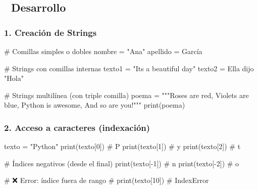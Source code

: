 \documentclass[
  doc,
  floatsintext,
  longtable,
  a4paper,
  nolmodern,
  notxfonts,
  notimes,
  12pt,
  colorlinks=true,linkcolor=blue,citecolor=blue,urlcolor=blue]{apa7}
\newenvironment{Shaded}{\begin{snugshade}}{\end{snugshade}}
\newcommand{\BuiltInTok}[1]{\textcolor[rgb]{0.00,0.23,0.31}{#1}}
\newcommand{\CommentTok}[1]{\textcolor[rgb]{0.37,0.37,0.37}{#1}}
\newcommand{\DecValTok}[1]{\textcolor[rgb]{0.68,0.00,0.00}{#1}}
\newcommand{\NormalTok}[1]{\textcolor[rgb]{0.00,0.23,0.31}{#1}}
\newcommand{\OperatorTok}[1]{\textcolor[rgb]{0.37,0.37,0.37}{#1}}
\newcommand{\StringTok}[1]{\textcolor[rgb]{0.13,0.47,0.30}{#1}}
\begin{document}
\subsection{📐 Desarrollo}\label{desarrollo}

\subsubsection{1. Creación de Strings}\label{creaciuxf3n-de-strings}

\begin{Shaded}
\begin{Highlighting}[]
\CommentTok{\# Comillas simples o dobles}
\NormalTok{nombre }\OperatorTok{=} \StringTok{"Ana"}
\NormalTok{apellido }\OperatorTok{=} \StringTok{\textquotesingle{}García\textquotesingle{}}

\CommentTok{\# Strings con comillas internas}
\NormalTok{texto1 }\OperatorTok{=} \StringTok{"It\textquotesingle{}s a beautiful day"}
\NormalTok{texto2 }\OperatorTok{=} \StringTok{\textquotesingle{}Ella dijo "Hola"\textquotesingle{}}

\CommentTok{\# Strings multilínea (con triple comilla)}
\NormalTok{poema }\OperatorTok{=} \StringTok{"""Roses are red,}
\StringTok{Violets are blue,}
\StringTok{Python is awesome,}
\StringTok{And so are you!"""}
\BuiltInTok{print}\NormalTok{(poema)}
\end{Highlighting}
\end{Shaded}

\subsubsection{2. Acceso a caracteres
(indexación)}\label{acceso-a-caracteres-indexaciuxf3n}

\begin{Shaded}
\begin{Highlighting}[]
\NormalTok{texto }\OperatorTok{=} \StringTok{"Python"}
\BuiltInTok{print}\NormalTok{(texto[}\DecValTok{0}\NormalTok{])  }\CommentTok{\# \textquotesingle{}P\textquotesingle{}}
\BuiltInTok{print}\NormalTok{(texto[}\DecValTok{1}\NormalTok{])  }\CommentTok{\# \textquotesingle{}y\textquotesingle{}}
\BuiltInTok{print}\NormalTok{(texto[}\DecValTok{2}\NormalTok{])  }\CommentTok{\# \textquotesingle{}t\textquotesingle{}}

\CommentTok{\# Índices negativos (desde el final)}
\BuiltInTok{print}\NormalTok{(texto[}\OperatorTok{{-}}\DecValTok{1}\NormalTok{])  }\CommentTok{\# \textquotesingle{}n\textquotesingle{}}
\BuiltInTok{print}\NormalTok{(texto[}\OperatorTok{{-}}\DecValTok{2}\NormalTok{])  }\CommentTok{\# \textquotesingle{}o\textquotesingle{}}

\CommentTok{\# ❌ Error: índice fuera de rango}
\CommentTok{\# print(texto[10])  \# IndexError}
\end{Highlighting}
\end{Shaded}
\end{document}
